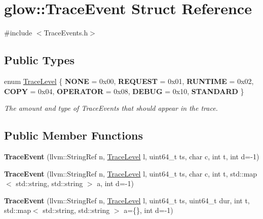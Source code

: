 \hypertarget{structglow_1_1_trace_event}{}\section{glow\+:\+:Trace\+Event Struct Reference}
\label{structglow_1_1_trace_event}


{\ttfamily \#include $<$Trace\+Events.\+h$>$}

\subsection*{Public Types}
\begin{DoxyCompactItemize}
\item 
\mbox{\label{structglow_1_1_trace_event_a10132a384d74408a112510cbe1b7d978}} 
enum \hyperlink{structglow_1_1_trace_event_a10132a384d74408a112510cbe1b7d978}{Trace\+Level} \{ \newline
{\bfseries N\+O\+NE} = 0x00, 
{\bfseries R\+E\+Q\+U\+E\+ST} = 0x01, 
{\bfseries R\+U\+N\+T\+I\+ME} = 0x02, 
{\bfseries C\+O\+PY} = 0x04, 
\newline
{\bfseries O\+P\+E\+R\+A\+T\+OR} = 0x08, 
{\bfseries D\+E\+B\+UG} = 0x10, 
{\bfseries S\+T\+A\+N\+D\+A\+RD}
 \}\begin{DoxyCompactList}\small\item\em The amount and type of Trace\+Events that should appear in the trace. \end{DoxyCompactList}
\end{DoxyCompactItemize}
\subsection*{Public Member Functions}
\begin{DoxyCompactItemize}
\item 
\mbox{\label{structglow_1_1_trace_event_a3db6299e7670cd1db9fe9f16eeba4597}} 
{\bfseries Trace\+Event} (llvm\+::\+String\+Ref n, \hyperlink{structglow_1_1_trace_event_a10132a384d74408a112510cbe1b7d978}{Trace\+Level} l, uint64\+\_\+t ts, char c, int t, int d=-\/1)
\item 
\mbox{\label{structglow_1_1_trace_event_a6534995ac3eef3d2ae830d03a194f15b}} 
{\bfseries Trace\+Event} (llvm\+::\+String\+Ref n, \hyperlink{structglow_1_1_trace_event_a10132a384d74408a112510cbe1b7d978}{Trace\+Level} l, uint64\+\_\+t ts, char c, int t, std\+::map$<$ std\+::string, std\+::string $>$ a, int d=-\/1)
\item 
\mbox{\label{structglow_1_1_trace_event_af4b7eafd0d5e85ccb2c198a16ca95eb6}} 
{\bfseries Trace\+Event} (llvm\+::\+String\+Ref n, \hyperlink{structglow_1_1_trace_event_a10132a384d74408a112510cbe1b7d978}{Trace\+Level} l, uint64\+\_\+t ts, uint64\+\_\+t dur, int t, std\+::map$<$ std\+::string, std\+::string $>$ a=\{\}, int d=-\/1)
\end{DoxyCompactItemize}

